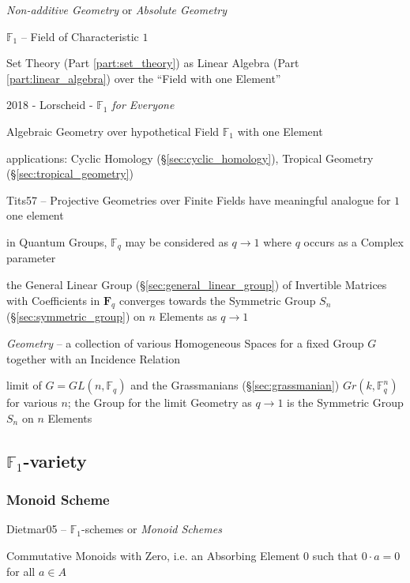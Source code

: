 \emph{Non-additive Geometry} or \emph{Absolute Geometry}

$\mathbb{F}_1$ -- Field of Characteristic $1$

Set Theory (Part \ref{part:set_theory}) as Linear Algebra (Part
\ref{part:linear_algebra}) over the ``Field with one Element''

2018 - Lorscheid - \emph{$\mathbb{F}_1$ for Everyone}

Algebraic Geometry over hypothetical Field $\mathbb{F}_1$ with one Element

applications: Cyclic Homology (\S\ref{sec:cyclic_homology}), Tropical Geometry
(\S\ref{sec:tropical_geometry})

Tits57 -- Projective Geometries over Finite Fields have meaningful analogue for
$1$ one element

in Quantum Groups, $\mathbb{F}_q$ may be considered as $q \rightarrow 1$ where
$q$ occurs as a Complex parameter

the General Linear Group (\S\ref{sec:general_linear_group}) of Invertible
Matrices with Coefficients in $\mathbf{F}_q$ converges towards the Symmetric
Group $S_n$ (\S\ref{sec:symmetric_group}) on $n$ Elements as $q \rightarrow 1$

\emph{Geometry} -- a collection of various Homogeneous Spaces for a fixed Group
$G$ together with an Incidence Relation

limit of $G = GL(n,\mathbb{F}_q)$ and the Grassmanians (\S\ref{sec:grassmanian})
$Gr(k,\mathbb{F}^n_q)$ for various $n$; the Group for the limit Geometry as
$q \rightarrow 1$ is the Symmetric Group $S_n$ on $n$ Elements



\subsection{$\mathbb{F}_1$-variety}\label{sec:f1_variety}

\subsubsection{Monoid Scheme}\label{sec:monoid_scheme}

Dietmar05 -- $\mathbb{F}_1$-schemes or \emph{Monoid Schemes}

Commutative Monoids with Zero, i.e. an Absorbing Element $0$ such that $0 \cdot
a = 0$ for all $a \in A$

